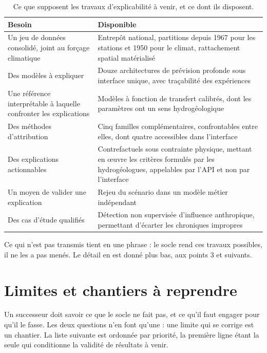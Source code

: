 \begin{table}[H]
\centering
\caption{Ce que supposent les travaux d'explicabilité à venir, et ce dont ils
disposent.}
\label{tab:transmis}
\begin{tabularx}{\textwidth}{@{}L{4.6cm}Y@{}}
\toprule
\textbf{Besoin} & \textbf{Disponible} \\
\midrule
Un jeu de données consolidé, joint au forçage climatique & Entrepôt national, partitions depuis
1967 pour les stations et 1950 pour le climat, rattachement spatial matérialisé \\
Des modèles à expliquer & Douze architectures de prévision profonde sous interface unique, avec
traçabilité des expériences \\
Une référence interprétable à laquelle confronter les explications & Modèles à fonction de
transfert calibrés, dont les paramètres ont un sens hydrogéologique \\
Des méthodes d'attribution & Cinq familles complémentaires, confrontables entre elles, dont
quatre accessibles dans l'interface \\
Des explications actionnables & Contrefactuels sous contrainte physique, mettant en œuvre les
critères formulés par les hydrogéologues, appelables par l'API et non par l'interface \\
Un moyen de valider une explication & Rejeu du scénario dans un modèle métier indépendant \\
Des cas d'étude qualifiés & Détection non supervisée d'influence anthropique, permettant
d'écarter les chroniques impropres \\
\bottomrule
\end{tabularx}
\end{table}

Ce qui n'est pas transmis tient en une phrase : le socle rend ces travaux possibles, il ne les a
pas menés. Le détail en est donné plus bas, aux points 3 et suivants.

\section{Limites et chantiers à reprendre}

Un successeur doit savoir ce que le socle ne fait pas, et ce qu'il faut engager pour qu'il le
fasse. Les deux questions n'en font qu'une : une limite qui se corrige est un chantier. La liste
suivante est ordonnée par priorité, la première ligne étant la seule qui conditionne la validité
de résultats à venir.

